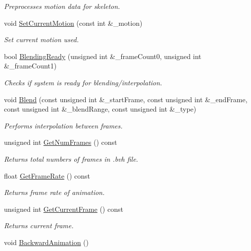 \begin{DoxyCompactItemize}
\begin{DoxyCompactList}\small\item\em Preprocesses motion data for skeleton. \end{DoxyCompactList}\item 
void \hyperlink{class_character_a2a6a73355dc0b94f54b0466bd00222aa}{Set\+Current\+Motion} (const int \&\+\_\+motion)
\begin{DoxyCompactList}\small\item\em Set current motion used. \end{DoxyCompactList}\item 
bool \hyperlink{class_character_ac4c00fc262864fbd016326ff1f14a6fe}{Blending\+Ready} (unsigned int \&\+\_\+frame\+Count0, unsigned int \&\+\_\+frame\+Count1)
\begin{DoxyCompactList}\small\item\em Checks if system is ready for blending/interpolation. \end{DoxyCompactList}\item 
void \hyperlink{class_character_a248ec48c8b954aae5285a81c1fc92bd7}{Blend} (const unsigned int \&\+\_\+start\+Frame, const unsigned int \&\+\_\+end\+Frame, const unsigned int \&\+\_\+blend\+Range, const unsigned int \&\+\_\+type)
\begin{DoxyCompactList}\small\item\em Performs interpolation between frames. \end{DoxyCompactList}\item 
unsigned int \hyperlink{class_character_a1902ad24234f8fb5b40f065c2bd3c6a1}{Get\+Num\+Frames} () const\hypertarget{class_character_a1902ad24234f8fb5b40f065c2bd3c6a1}{}\label{class_character_a1902ad24234f8fb5b40f065c2bd3c6a1}

\begin{DoxyCompactList}\small\item\em Returns total numbers of frames in .bvh file. \end{DoxyCompactList}\item 
float \hyperlink{class_character_a7f504a9a691124b258dcf2e579198b79}{Get\+Frame\+Rate} () const\hypertarget{class_character_a7f504a9a691124b258dcf2e579198b79}{}\label{class_character_a7f504a9a691124b258dcf2e579198b79}

\begin{DoxyCompactList}\small\item\em Returns frame rate of animation. \end{DoxyCompactList}\item 
unsigned int \hyperlink{class_character_a9855a5241e3e60efb9bc258ec02ad000}{Get\+Current\+Frame} () const
\begin{DoxyCompactList}\small\item\em Returns current frame. \end{DoxyCompactList}\item 
void \hyperlink{class_character_a55a31c755a92e0f5dcb264004350dd4e}{Backward\+Animation} ()\hypertarget{class_character_a55a31c755a92e0f5dcb264004350dd4e}{}\label{class_character_a55a31c755a92e0f5dcb264004350dd4e}


\end{DoxyCompactItemize}
